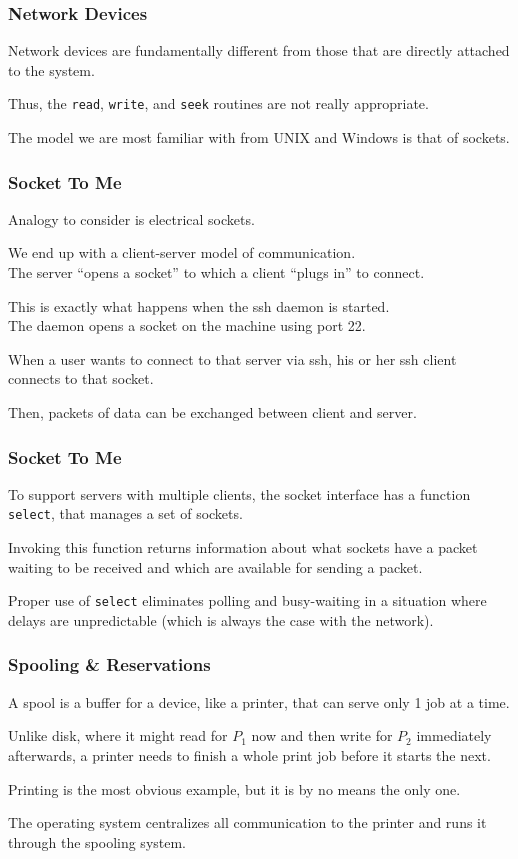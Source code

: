 \begin{frame}
\frametitle{Network Devices}

Network devices are fundamentally different from those that are directly attached to the system. 

Thus, the \texttt{read}, \texttt{write}, and \texttt{seek} routines are not really appropriate. 

The model we are most familiar with from UNIX and Windows is that of \alert{sockets}.


\end{frame}

\begin{frame}
\frametitle{Socket To Me}

Analogy to consider is electrical sockets. 

We end up with a client-server model of communication.\\
\quad The server ``opens a socket'' to which a client ``plugs in'' to connect. 

This is exactly what happens when the ssh daemon is started.\\
\quad The daemon opens a socket on the machine using port 22.

When a user wants to connect to that server via ssh, his or her ssh client connects to that socket. 

Then, packets of data can be exchanged between client and server.


\end{frame}

\begin{frame}
\frametitle{Socket To Me}

To support servers with multiple clients, the socket interface has a function \texttt{select}, that manages a set of sockets. 

Invoking this function returns information about what sockets have a packet waiting to be received and which are available for sending a packet. 

Proper use of \texttt{select} eliminates polling and busy-waiting in a situation where delays are unpredictable (which is always the case with the network).


\end{frame}

\begin{frame}
\frametitle{Spooling \& Reservations}

A \alert{spool} is a buffer for a device, like a printer, that can serve only 1 job at a time. 

Unlike disk, where it might read for $P_{1}$ now and then write for $P_{2}$ immediately afterwards, a printer needs to finish a whole print job before it starts the next. 

Printing is the most obvious example, but it is by no means the only one. 

The operating system centralizes all communication to the printer and runs it through the spooling system. 


\end{frame}




